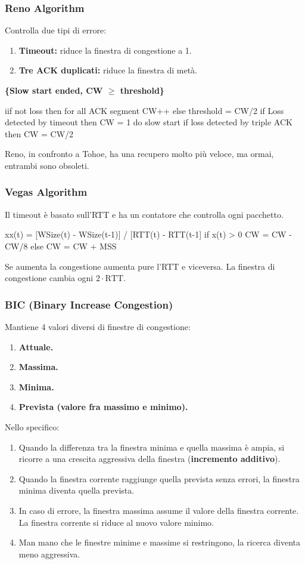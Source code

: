\subsubsection{Reno Algorithm}
Controlla due tipi di errore:
\begin{enumerate}
    \item \textbf{Timeout:} riduce la finestra di congestione a 1.
    \item \textbf{Tre ACK duplicati:} riduce la finestra di metà.
\end{enumerate}

\textbf{\{Slow start ended, CW $\ge$ threshold\}}
\begin{bashbox}
iif not loss then
    for all ACK segment 
        CW++
else
    threshold = CW/2
    if Loss detected by timeout then
        CW = 1
        do slow start
    if loss detected by triple ACK then
        CW = CW/2
\end{bashbox}
Reno, in confronto a Tohoe, ha una recupero molto più veloce, ma ormai, entrambi sono obsoleti.

\subsubsection{Vegas Algorithm}
Il timeout è basato sull'RTT e ha un contatore che controlla ogni pacchetto.

\begin{bashbox}
xx(t) = [WSize(t) - WSize(t-1)] / [RTT(t) - RTT(t-1]
if x(t) > 0
    CW = CW - CW/8
else
    CW = CW + MSS
\end{bashbox}
Se aumenta la congestione aumenta pure l'RTT e viceversa. La finestra di congestione cambia ogni $2 \cdot \text{RTT}$.

\subsubsection{BIC (Binary Increase Congestion)}
Mantiene 4 valori diversi di finestre di congestione:
\begin{enumerate}
    \item \textbf{Attuale.}
    \item \textbf{Massima.}
    \item \textbf{Minima.}
    \item \textbf{Prevista (valore fra massimo e minimo).}
\end{enumerate}
Nello specifico: 
\begin{enumerate}
    \item Quando la differenza tra la finestra minima e quella massima è ampia, si ricorre a una crescita aggressiva della finestra (\textbf{incremento additivo}).
    \item Quando la finestra corrente raggiunge quella prevista senza errori, la finestra minima diventa quella prevista.
    \item In caso di errore, la finestra massima assume il valore della finestra corrente. La finestra corrente si riduce al nuovo valore minimo.
    \item Man mano che le finestre minime e massime si restringono, la ricerca diventa meno aggressiva.
\end{enumerate}

